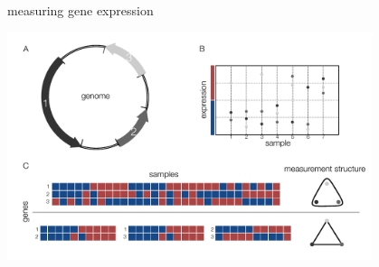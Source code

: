 \begin{frame}
measuring gene expression
\begin{center}
\includegraphics[width=0.8\textwidth]{fig/figure_expression_concept.pdf}
\end{center}
\end{frame}
